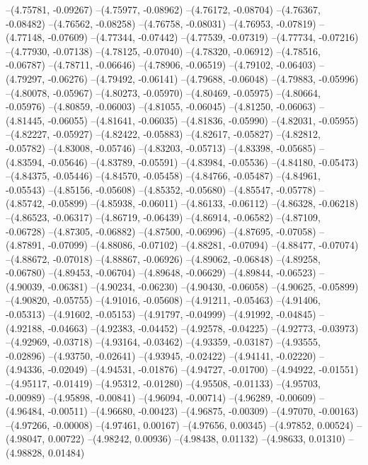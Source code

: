 --(4.75781, -0.09267)
--(4.75977, -0.08962)
--(4.76172, -0.08704)
--(4.76367, -0.08482)
--(4.76562, -0.08258)
--(4.76758, -0.08031)
--(4.76953, -0.07819)
--(4.77148, -0.07609)
--(4.77344, -0.07442)
--(4.77539, -0.07319)
--(4.77734, -0.07216)
--(4.77930, -0.07138)
--(4.78125, -0.07040)
--(4.78320, -0.06912)
--(4.78516, -0.06787)
--(4.78711, -0.06646)
--(4.78906, -0.06519)
--(4.79102, -0.06403)
--(4.79297, -0.06276)
--(4.79492, -0.06141)
--(4.79688, -0.06048)
--(4.79883, -0.05996)
--(4.80078, -0.05967)
--(4.80273, -0.05970)
--(4.80469, -0.05975)
--(4.80664, -0.05976)
--(4.80859, -0.06003)
--(4.81055, -0.06045)
--(4.81250, -0.06063)
--(4.81445, -0.06055)
--(4.81641, -0.06035)
--(4.81836, -0.05990)
--(4.82031, -0.05955)
--(4.82227, -0.05927)
--(4.82422, -0.05883)
--(4.82617, -0.05827)
--(4.82812, -0.05782)
--(4.83008, -0.05746)
--(4.83203, -0.05713)
--(4.83398, -0.05685)
--(4.83594, -0.05646)
--(4.83789, -0.05591)
--(4.83984, -0.05536)
--(4.84180, -0.05473)
--(4.84375, -0.05446)
--(4.84570, -0.05458)
--(4.84766, -0.05487)
--(4.84961, -0.05543)
--(4.85156, -0.05608)
--(4.85352, -0.05680)
--(4.85547, -0.05778)
--(4.85742, -0.05899)
--(4.85938, -0.06011)
--(4.86133, -0.06112)
--(4.86328, -0.06218)
--(4.86523, -0.06317)
--(4.86719, -0.06439)
--(4.86914, -0.06582)
--(4.87109, -0.06728)
--(4.87305, -0.06882)
--(4.87500, -0.06996)
--(4.87695, -0.07058)
--(4.87891, -0.07099)
--(4.88086, -0.07102)
--(4.88281, -0.07094)
--(4.88477, -0.07074)
--(4.88672, -0.07018)
--(4.88867, -0.06926)
--(4.89062, -0.06848)
--(4.89258, -0.06780)
--(4.89453, -0.06704)
--(4.89648, -0.06629)
--(4.89844, -0.06523)
--(4.90039, -0.06381)
--(4.90234, -0.06230)
--(4.90430, -0.06058)
--(4.90625, -0.05899)
--(4.90820, -0.05755)
--(4.91016, -0.05608)
--(4.91211, -0.05463)
--(4.91406, -0.05313)
--(4.91602, -0.05153)
--(4.91797, -0.04999)
--(4.91992, -0.04845)
--(4.92188, -0.04663)
--(4.92383, -0.04452)
--(4.92578, -0.04225)
--(4.92773, -0.03973)
--(4.92969, -0.03718)
--(4.93164, -0.03462)
--(4.93359, -0.03187)
--(4.93555, -0.02896)
--(4.93750, -0.02641)
--(4.93945, -0.02422)
--(4.94141, -0.02220)
--(4.94336, -0.02049)
--(4.94531, -0.01876)
--(4.94727, -0.01700)
--(4.94922, -0.01551)
--(4.95117, -0.01419)
--(4.95312, -0.01280)
--(4.95508, -0.01133)
--(4.95703, -0.00989)
--(4.95898, -0.00841)
--(4.96094, -0.00714)
--(4.96289, -0.00609)
--(4.96484, -0.00511)
--(4.96680, -0.00423)
--(4.96875, -0.00309)
--(4.97070, -0.00163)
--(4.97266, -0.00008)
--(4.97461, 0.00167)
--(4.97656, 0.00345)
--(4.97852, 0.00524)
--(4.98047, 0.00722)
--(4.98242, 0.00936)
--(4.98438, 0.01132)
--(4.98633, 0.01310)
--(4.98828, 0.01484)
